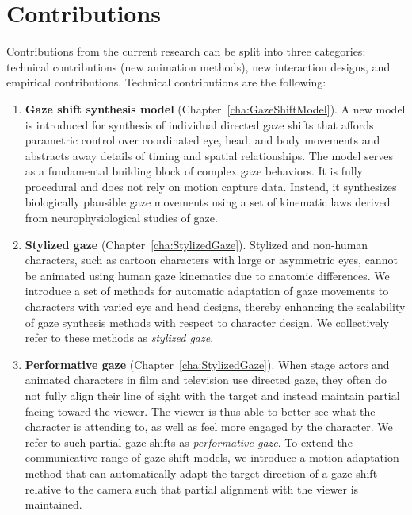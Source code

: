 \section{Contributions}

Contributions from the current research can be split into three categories: technical contributions (new animation methods), new interaction designs, and empirical contributions. Technical contributions are the following:

\begin{enumerate}
\item \textbf{Gaze shift synthesis model} (Chapter~\ref{cha:GazeShiftModel}). A new model is introduced for synthesis of individual directed gaze shifts that affords parametric control over coordinated eye, head, and body movements and abstracts away details of timing and spatial relationships. The model serves as a fundamental building block of complex gaze behaviors. It is fully procedural and does not rely on motion capture data. Instead, it synthesizes biologically plausible gaze movements using a set of kinematic laws derived from neurophysiological studies of gaze.
\item \textbf{Stylized gaze} (Chapter~\ref{cha:StylizedGaze}). Stylized and non-human characters, such as cartoon characters with large or asymmetric eyes, cannot be animated using human gaze kinematics due to anatomic differences. We introduce a set of methods for automatic adaptation of gaze movements to characters with varied eye and head designs, thereby enhancing the scalability of gaze synthesis methods with respect to character design. We collectively refer to these methods as \emph{stylized gaze}.
\item \textbf{Performative gaze} (Chapter~\ref{cha:StylizedGaze}). When stage actors and animated characters in film and television use directed gaze, they often do not fully align their line of sight with the target and instead maintain partial facing toward the viewer. The viewer is thus able to better see what the character is attending to, as well as feel more engaged by the character. We refer to such partial gaze shifts as \emph{performative gaze}. To extend the communicative range of gaze shift models, we introduce a motion adaptation method that can automatically adapt the target direction of a gaze shift relative to the camera such that partial alignment with the viewer is maintained.

\end{enumerate}
